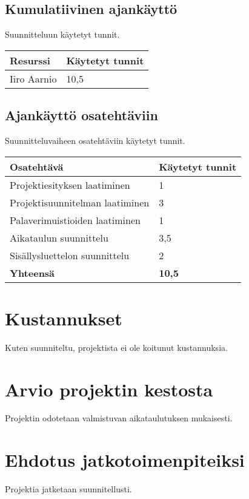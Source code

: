 \documentclass[a4paper, 12pt, finnish]{article}
\begin{document}
\subsection{Kumulatiivinen ajankäyttö}
Suunnitteluun käytetyt tunnit.
\begin{table}[htpb]
\begin{tabular}{|l|l|}
\hline
Resurssi & Käytetyt tunnit \\ \hline
Iiro Aarnio & 10,5 \\ \hline
\end{tabular}%
\end{table}

\subsection{Ajankäyttö osatehtäviin}

Suunnitteluvaiheen osatehtäviin käytetyt tunnit.
\begin{table}[!htpb]
\begin{tabular}{|l|l|}
\hline
Osatehtävä & Käytetyt tunnit \\ \hline
Projektiesityksen laatiminen & 1 \\ \hline
Projektisuunnitelman laatiminen & 3 \\ \hline
Palaverimuistioiden laatiminen & 1 \\ \hline
Aikataulun suunnittelu & 3,5 \\ \hline
Sisällysluettelon suunnittelu & 2 \\ \hline
    \textbf{Yhteensä} & \textbf{10,5}  \\ \hline
\end{tabular}%
\end{table}

\section{Kustannukset}

Kuten suunniteltu, projektista ei ole koitunut kustannuksia.

\section{Arvio projektin kestosta}

Projektin odotetaan valmistuvan aikataulutuksen mukaisesti.

\section{Ehdotus jatkotoimenpiteiksi}

Projektia jatketaan suunnitellusti.
\end{document}
